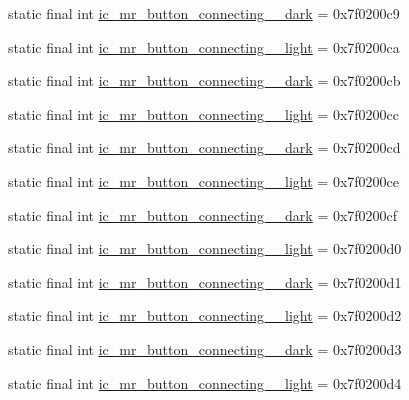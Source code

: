 \begin{CompactItemize}
static final int \hyperlink{classandroid_1_1support_1_1v7_1_1recyclerview_1_1_r_1_1drawable_cb226fe1c4eb6a4622acf982a990b8cd}{ic\_\-mr\_\-button\_\-connecting\_\_\-dark} = 0x7f0200c9
\item 
static final int \hyperlink{classandroid_1_1support_1_1v7_1_1recyclerview_1_1_r_1_1drawable_54c2c5d845bc0910caacfd9b85ff2f91}{ic\_\-mr\_\-button\_\-connecting\_\_\-light} = 0x7f0200ca
\item 
static final int \hyperlink{classandroid_1_1support_1_1v7_1_1recyclerview_1_1_r_1_1drawable_1b8dba20d796bd76aa6ef623c640e835}{ic\_\-mr\_\-button\_\-connecting\_\_\-dark} = 0x7f0200cb
\item 
static final int \hyperlink{classandroid_1_1support_1_1v7_1_1recyclerview_1_1_r_1_1drawable_880275ca8e160ca683737d15fb90e57d}{ic\_\-mr\_\-button\_\-connecting\_\_\-light} = 0x7f0200cc
\item 
static final int \hyperlink{classandroid_1_1support_1_1v7_1_1recyclerview_1_1_r_1_1drawable_003a96ae966d92aa0891115247e2bde2}{ic\_\-mr\_\-button\_\-connecting\_\_\-dark} = 0x7f0200cd
\item 
static final int \hyperlink{classandroid_1_1support_1_1v7_1_1recyclerview_1_1_r_1_1drawable_077bae01c15a3c2321f160337421f840}{ic\_\-mr\_\-button\_\-connecting\_\_\-light} = 0x7f0200ce
\item 
static final int \hyperlink{classandroid_1_1support_1_1v7_1_1recyclerview_1_1_r_1_1drawable_5ab3ec221ec5efdb5ea8f44ed5cd8e42}{ic\_\-mr\_\-button\_\-connecting\_\_\-dark} = 0x7f0200cf
\item 
static final int \hyperlink{classandroid_1_1support_1_1v7_1_1recyclerview_1_1_r_1_1drawable_b58fece81887fdd02ec69165c37165e8}{ic\_\-mr\_\-button\_\-connecting\_\_\-light} = 0x7f0200d0
\item 
static final int \hyperlink{classandroid_1_1support_1_1v7_1_1recyclerview_1_1_r_1_1drawable_6e2847271eeef3323ed6f94422ba37b6}{ic\_\-mr\_\-button\_\-connecting\_\_\-dark} = 0x7f0200d1
\item 
static final int \hyperlink{classandroid_1_1support_1_1v7_1_1recyclerview_1_1_r_1_1drawable_7fcfe54c84071d51cae833724b354c1e}{ic\_\-mr\_\-button\_\-connecting\_\_\-light} = 0x7f0200d2
\item 
static final int \hyperlink{classandroid_1_1support_1_1v7_1_1recyclerview_1_1_r_1_1drawable_15a6919af8da456d751bb1f8bfecc053}{ic\_\-mr\_\-button\_\-connecting\_\_\-dark} = 0x7f0200d3
\item 
static final int \hyperlink{classandroid_1_1support_1_1v7_1_1recyclerview_1_1_r_1_1drawable_213f077c97740010995dcf528aba514c}{ic\_\-mr\_\-button\_\-connecting\_\_\-light} = 0x7f0200d4

\end{CompactItemize}
